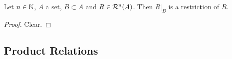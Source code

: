 \begin{ex}
	Let $n \in \mathbb{N}$, $A$ a set, $B \subset A$ and $R \in \mathcal{R}^n(A)$. Then $R|_B$ is a restriction of $R$.
\end{ex}

\begin{proof}
	Clear. 
\end{proof}























































\subsection{Product Relations}




























































